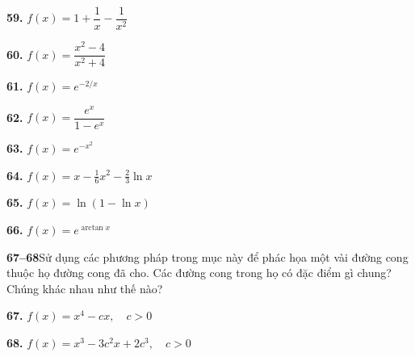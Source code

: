 \begin{minipage}[t]{0.485\textwidth}
\vspace{0.3em}
\begin{minipage}[t]{0.48\linewidth}
  \textbf{59.} $f(x) = 1 + \dfrac{1}{x} - \dfrac{1}{x^2}$
\end{minipage}\hfill
\begin{minipage}[t]{0.50\linewidth}
  \textbf{60.} $f(x) = \dfrac{x^2 - 4}{x^2 + 4}$
\end{minipage}

\end{minipage}%
\hfill
\begin{minipage}[t]{0.485\textwidth}

\begin{minipage}[t]{0.48\linewidth}
  \textbf{61.} $f(x) = e^{-2/x}$
\end{minipage}\hfill
\begin{minipage}[t]{0.50\linewidth}
  \textbf{62.} $f(x) = \dfrac{e^x}{1 - e^x}$
\end{minipage}

\vspace{0.35em}
\begin{minipage}[t]{0.48\linewidth}
  \textbf{63.} $f(x) = e^{-x^2}$
\end{minipage}\hfill
\begin{minipage}[t]{0.50\linewidth}
  \textbf{64.} $f(x) = x - \frac{1}{6}x^2 - \frac{2}{3}\ln x$
\end{minipage}

\vspace{0.35em}
\begin{minipage}[t]{0.48\linewidth}
  \textbf{65.} $f(x) = \ln(1 - \ln x)$
\end{minipage}\hfill
\begin{minipage}[t]{0.50\linewidth}
  \textbf{66.} $f(x) = e^{\arctan x}$
\end{minipage}

\exerciseline

{\color{stewartblue}\textbf{67--68}}\hspace{0.5em}Sử dụng các phương pháp trong mục này để phác họa một vài đường cong thuộc họ đường cong đã cho. Các đường cong trong họ có đặc điểm gì chung? Chúng khác nhau như thế nào?

\vspace{0.3em}
\noindent\textbf{67.} $f(x) = x^4 - cx, \quad c > 0$

\vspace{0.25em}
\noindent\textbf{68.} $f(x) = x^3 - 3c^2x + 2c^3, \quad c > 0$


\end{minipage}
